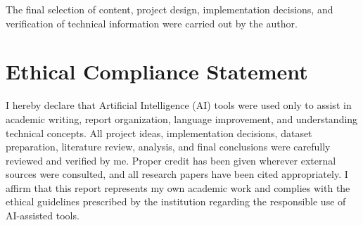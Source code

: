 The final selection of content, project design, implementation decisions, and verification of technical information were carried out by the author.


\section{Ethical Compliance Statement}

I hereby declare that Artificial Intelligence (AI) tools were used only to assist in academic writing, report organization, language improvement, and understanding technical concepts. All project ideas, implementation decisions, dataset preparation, literature review, analysis, and final conclusions were carefully reviewed and verified by me. Proper credit has been given wherever external sources were consulted, and all research papers have been cited appropriately. I affirm that this report represents my own academic work and complies with the ethical guidelines prescribed by the institution regarding the responsible use of AI-assisted tools.

